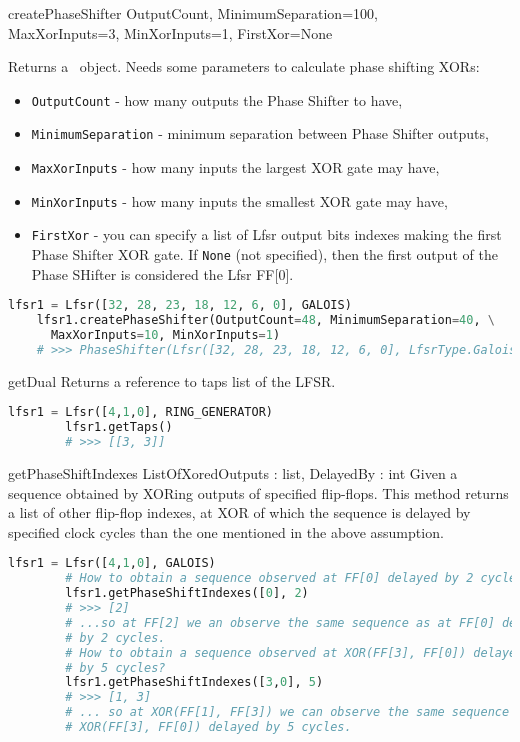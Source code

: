  {createPhaseShifter} {OutputCount, MinimumSeparation=100, \\ MaxXorInputs=3, MinXorInputs=1, FirstXor=None} {
	Returns a \PhaseShifter\ object. Needs some parameters to calculate phase shifting XORs:
	\begin{itemize}
		\item \texttt{OutputCount} - how many outputs the Phase Shifter to have,
		\item \texttt{MinimumSeparation} - minimum separation between Phase Shifter outputs,
		\item \texttt{MaxXorInputs} - how many inputs the largest XOR gate may have,
		\item \texttt{MinXorInputs} - how many inputs the smallest XOR gate may have,
		\item \texttt{FirstXor} - you can specify a list of Lfsr output bits indexes making the first Phase Shifter XOR gate. If \texttt{None} (not specified), then the first output of the Phase SHifter is considered the Lfsr FF[0].
	\end{itemize}
}
\begin{lstlisting}[language=Python]
	lfsr1 = Lfsr([32, 28, 23, 18, 12, 6, 0], GALOIS)
	lfsr1.createPhaseShifter(OutputCount=48, MinimumSeparation=40, \
	  MaxXorInputs=10, MinXorInputs=1)
	# >>> PhaseShifter(Lfsr([32, 28, 23, 18, 12, 6, 0], LfsrType.Galois), 48)
\end{lstlisting}

 {getDual} {} {
	Returns a reference to taps list of the LFSR.
}
\begin{lstlisting}[language=Python]
		lfsr1 = Lfsr([4,1,0], RING_GENERATOR)
		lfsr1.getTaps()
		# >>> [[3, 3]]
\end{lstlisting}

 {getPhaseShiftIndexes} {ListOfXoredOutputs : list, DelayedBy : int} {
	Given a sequence obtained by XORing outputs of specified flip-flops. This method returns a list of other flip-flop indexes, at XOR of which the sequence is delayed by specified clock cycles than the one mentioned in the above assumption.
}
\begin{lstlisting}[language=Python]
		lfsr1 = Lfsr([4,1,0], GALOIS)
		# How to obtain a sequence observed at FF[0] delayed by 2 cycles?
		lfsr1.getPhaseShiftIndexes([0], 2)
		# >>> [2]
		# ...so at FF[2] we an observe the same sequence as at FF[0] delayed 
		# by 2 cycles.
		# How to obtain a sequence observed at XOR(FF[3], FF[0]) delayed 
		# by 5 cycles?
		lfsr1.getPhaseShiftIndexes([3,0], 5)
		# >>> [1, 3]
		# ... so at XOR(FF[1], FF[3]) we can observe the same sequence as at
		# XOR(FF[3], FF[0]) delayed by 5 cycles.
\end{lstlisting}

